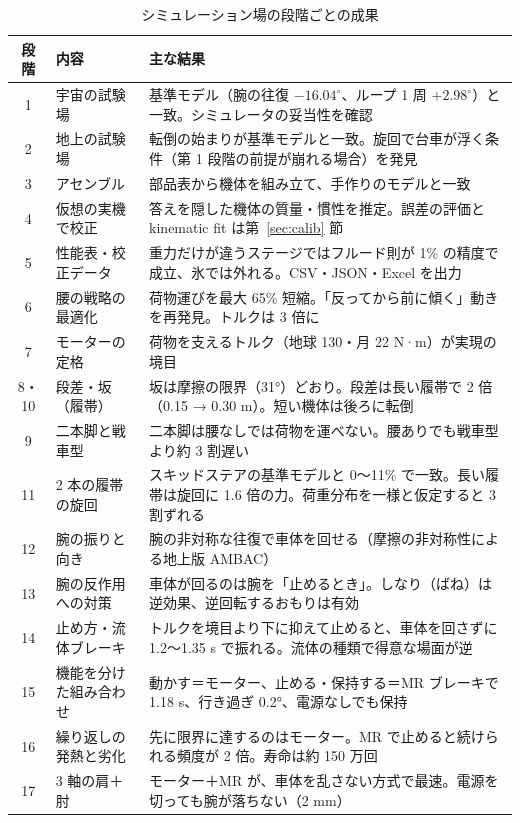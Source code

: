 \documentclass[paper=a4paper,fontsize=10pt,twocolumn,column_gap=2zw,line_length=24zw,number_of_lines=46,head_space=20mm]{jlreq}
\begin{document}
\begin{table}[t]\centering\small
\caption{シミュレーション場の段階ごとの成果}\label{tab:stages}
\setlength{\tabcolsep}{4pt}
\begin{tabular}{clp{}}\toprule
段階 & 内容 & 主な結果 \\\midrule
1 & 宇宙の試験場 & 基準モデル（腕の往復 $-16.04^\circ$、ループ 1 周 $+2.98^\circ$）と一致。シミュレータの妥当性を確認 \\
2 & 地上の試験場 & 転倒の始まりが基準モデルと一致。旋回で台車が浮く条件（第 1 段階の前提が崩れる場合）を発見 \\
3 & アセンブル & 部品表から機体を組み立て、手作りのモデルと一致 \\
4 & 仮想の実機で校正 & 答えを隠した機体の質量・慣性を推定。誤差の評価と kinematic fit は第~\ref{sec:calib} 節 \\
5 & 性能表・校正データ & 重力だけが違うステージではフルード則が 1\% の精度で成立、氷では外れる。CSV・JSON・Excel を出力 \\
6 & 腰の戦略の最適化 & 荷物運びを最大 65\% 短縮。「反ってから前に傾く」動きを再発見。トルクは 3 倍に \\
7 & モーターの定格 & 荷物を支えるトルク（地球 130・月 22 N·m）が実現の境目 \\
8・10 & 段差・坂（履帯） & 坂は摩擦の限界（31°）どおり。段差は長い履帯で 2 倍（0.15 → 0.30 m）。短い機体は後ろに転倒 \\
9 & 二本脚と戦車型 & 二本脚は腰なしでは荷物を運べない。腰ありでも戦車型より約 3 割遅い \\
11 & 2 本の履帯の旋回 & スキッドステアの基準モデルと 0〜11\% で一致。長い履帯は旋回に 1.6 倍の力。荷重分布を一様と仮定すると 3 割ずれる \\
12 & 腕の振りと向き & 腕の非対称な往復で車体を回せる（摩擦の非対称性による地上版 AMBAC） \\
13 & 腕の反作用への対策 & 車体が回るのは腕を「止めるとき」。しなり（ばね）は逆効果、逆回転するおもりは有効 \\
14 & 止め方・流体ブレーキ & トルクを境目より下に抑えて止めると、車体を回さずに 1.2〜1.35 s で振れる。流体の種類で得意な場面が逆 \\
15 & 機能を分けた組み合わせ & 動かす＝モーター、止める・保持する＝MR ブレーキで 1.18 s、行き過ぎ 0.2°、電源なしでも保持 \\
16 & 繰り返しの発熱と劣化 & 先に限界に達するのはモーター。MR で止めると続けられる頻度が 2 倍。寿命は約 150 万回 \\
17 & 3 軸の肩＋肘 & モーター＋MR が、車体を乱さない方式で最速。電源を切っても腕が落ちない（2 mm） \\

\end{tabular}
\end{table}
\end{document}
